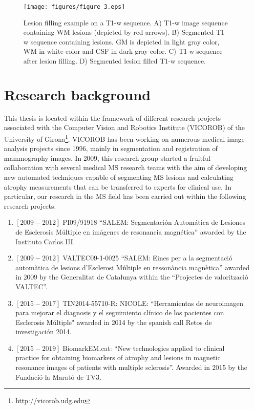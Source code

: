 \begin{figure}[top]
  \begin{center}
    \texttt{[image: figures/figure\_3.eps]}
  \end{center}
    \caption[Lesion filling example on a T1-w sequence]{Lesion filling example on a T1-w sequence. A) T1-w image sequence containing WM lesions (depicted by red arrows). B) Segmented T1-w sequence containing lesions. GM is depicted in light gray color, WM in white color and CSF in dark gray color.  C) T1-w sequence after lesion filling. D) Segmented lesion filled T1-w sequence.}
    \label{lesion_filling}
\end{figure}

\section{Research background}
\label{sec:research_background}

This thesis is located within the framework of different research projects associated with the Computer Vision and Robotics Institute (VICOROB) of the University of Girona\footnote{http://vicorob.udg.edu}. VICOROB has been working on numerous medical image analysis projects since 1996, mainly in segmentation and registration of mammography images. In 2009, this research group started a fruitful collaboration with several medical MS research teams with the aim of developing new automated techniques capable of segmenting MS lesions and calculating atrophy measurements that can be transferred to experts for clinical use. In particular, our research in the MS field has been carried out within the following research projects:

\begin{enumerate}

\item $[2009-2012]$ PI09/91918 ``SALEM: Segmentaci\'{o}n Autom\'{a}tica de Lesiones de Esclerosis M\'{u}ltiple en im\'{a}genes de resonancia magn\'{e}tica'' awarded by the Instituto Carlos III. 

\item $[2009-2012]$ VALTEC09-1-0025 ``SALEM: Eines per a la segmentaci\'{o} autom\`{a}tica de lesions d'Esclerosi M\'{u}ltiple en resson\`{a}ncia magn\`{e}tica'' awarded in 2009 by the Generalitat de Catalunya within the ``Projectes de valoritzaci\'{o} VALTEC''.

\item $[2015-2017]$ TIN2014-55710-R: NICOLE: ``Herramientas de neuroimagen para mejorar el diagnosis y el seguimiento cl\'{i}nico de los pacientes con Esclerosis M\'{u}ltiple" awarded in 2014 by the spanish call Retos de investigaci\'{o}n 2014.

\item $[2015-2019]$ BiomarkEM.cat: ``New technologies applied to clinical practice for obtaining biomarkers of  atrophy and lesions in magnetic resonance images of patients with multiple sclerosis''. Awarded in 2015 by the Fundaci\'{o} la Marat\'{o} de TV3.

\end{enumerate}

